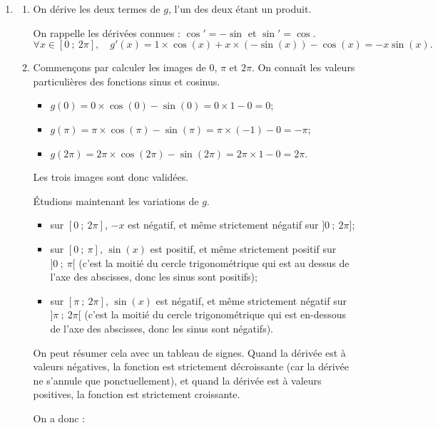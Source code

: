 \begin{enumerate}
\item \begin{enumerate}
\item On dérive les deux termes de $g$, l'un des deux étant un produit.

On rappelle les dérivées connues : $\cos'=-\sin$ et $\sin'=\cos$.
\[
\forall x\in [0~;~2\pi],\quad g'(x)=1\times \cos(x)+x\times \left(-\sin(x)\right)-\cos(x)=-x\sin(x).
\]

\item Commençons par calculer les images de 0, $\pi$ et $2\pi$. On connaît les valeurs particulières des fonctions sinus et cosinus.
\begin{itemize}
\item $g(0)=0\times \cos(0)-\sin(0)=0\times 1-0=0$;
\item $g(\pi)=\pi\times \cos(\pi)-\sin(\pi)=\pi\times(-1)-0=-\pi$;
\item $g(2\pi)=2\pi\times \cos(2\pi)-\sin(2\pi)=2\pi\times 1-0=2\pi$.
\end{itemize}
Les trois images sont donc validées.

Étudions maintenant les variations de $g$.
\begin{itemize}
\item sur $[0~;~2\pi]$, $-x$ est négatif, et même strictement négatif sur $]0~;~2\pi]$;
\item sur $[0~;~\pi]$, $\sin(x)$ est positif, et même strictement positif sur $]0~;~\pi[$ (c'est la moitié du cercle trigonométrique qui est au dessus de l'axe des abscisses, donc les sinus sont positifs);
\item sur $[\pi~;~2\pi]$, $\sin(x)$ est négatif, et même strictement négatif sur $]\pi~;~2\pi[$ (c'est la moitié du cercle trigonométrique qui est en-dessous de l'axe des abscisses, donc les sinus sont négatifs).
\end{itemize}
On peut résumer cela avec un tableau de signes. Quand la dérivée est à valeurs négatives, la fonction est strictement décroissante (car la dérivée ne s'annule que ponctuellement), et quand la dérivée est à valeurs positives, la fonction est strictement croissante.

On a donc :

\begin{center}
\end{center}
\end{enumerate}
\end{enumerate}
